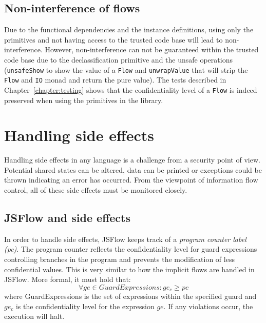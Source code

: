 \subsection{Non-interference of flows}
Due to the functional dependencies and the instance definitions, using only the primitives and not having access to the trusted code base will lead to non-interference. However, non-interference can not be guaranteed within the trusted code base due to the declassification primitive and the unsafe operations ({\tt unsafeShow} to show the value of a {\tt Flow} and {\tt unwrapValue} that will strip the {\tt Flow} and {\tt IO} monad and return the pure value). The tests described in Chapter~\ref{chapter:testing} shows that the confidentiality level of a {\tt Flow} is indeed preserved when using the primitives in the library.

\section{Handling side effects}
Handling side effects in any language is a challenge from a security point of view. Potential shared states can be altered, data can be printed or exceptions could be thrown indicating an error has occurred. From the viewpoint of information flow control, all of these side effects must be monitored closely.

\subsection{JSFlow and side effects}
In order to handle side effects, JSFlow keeps track of a \emph{program counter label (pc)}. The program counter reflects the confidentiality level for guard expressions controlling branches in the program and prevents the modification of less confidential values. This is very similar to how the implicit flows are handled in JSFlow. More formal, it must hold that:
\[
\forall ge \in GuardExpressions: ge_c \geq pc
\]
where GuardExpressions is the set of expressions within the specified guard and \(ge_c\) is the confidentiality level for the expression \(ge\). If any violations occur, the execution will halt.

